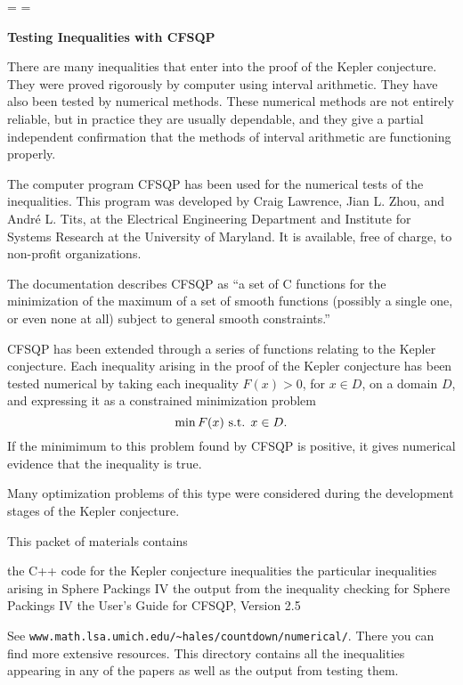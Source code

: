 \magnification=
\parskip=\baselineskip
\centerline{\bf Testing Inequalities with CFSQP}
\bigskip

There are many inequalities that enter into the proof of the Kepler
conjecture.  They were proved rigorously by computer using 
interval arithmetic.  They have also been tested by 
numerical methods.  These numerical methods are not entirely reliable,
but in practice they are usually dependable, and they give a
partial independent confirmation that the methods of interval
arithmetic are functioning properly.

The computer program CFSQP has been used for the numerical tests of the
inequalities.  This program was developed by Craig Lawrence,
Jian L. Zhou, and Andr\'e L. Tits, at the Electrical Engineering
Department and Institute for Systems Research at the University of
Maryland.   It is available, free of charge, to non-profit
organizations.

The documentation describes CFSQP as ``a set of C functions for the
minimization of the maximum of a set of smooth functions (possibly
a single one, or even none at all) subject to general smooth
constraints.''

CFSQP has been extended through a series of functions relating to
the Kepler conjecture.  Each inequality arising in the proof of
the Kepler conjecture has been tested numerical by taking each
inequality $F(x)>0$, for $x \in D$, on a domain $D$, and expressing
it as a constrained minimization problem 
$$\min F(x)\hbox{ s.t. }   x\in D.$$
If the minimimum to this problem found by CFSQP is positive, it gives
numerical evidence that the inequality is true.

Many optimization problems of this type were considered during
the development stages of the Kepler conjecture.


This packet of materials contains

\noindent
the C++ code for the Kepler conjecture inequalities\hfil\break
the particular inequalities arising in Sphere Packings IV\hfil\break
the output from the inequality checking for Sphere Packings IV\hfil\break
the User's Guide for CFSQP, Version 2.5

See {\tt www.math.lsa.umich.edu/\~\relax hales/countdown/numerical/}.  There
you can find more extensive resources.
This directory contains all the inequalities appearing
in any of the papers as well as the output from testing
them.


\bye
